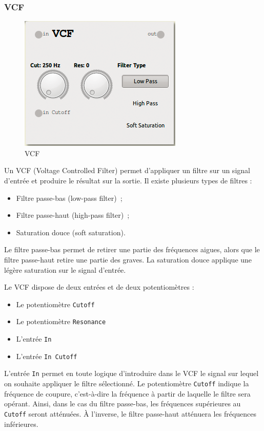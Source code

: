 \documentclass[a4paper,oneside,frenchb,12pt]{article}
\begin{document}
\subsubsection{VCF}

\begin{figure}[h!]
\centering
\includegraphics[scale=0.5]{../img/png/vcf.png}
\caption{VCF}
\end{figure}

Un VCF (Voltage Controlled Filter) permet d'appliquer un filtre sur un
signal d'entrée et produire le résultat sur la sortie. Il existe
plusieurs types de filtres :

\begin{itemize}
\item
  Filtre passe-bas (low-pass filter)~;
\item
  Filtre passe-haut (high-pass filter)~;
\item
  Saturation douce (soft saturation).
\end{itemize}
Le filtre passe-bas permet de retirer une partie des fréquences aigues,
alors que le filtre passe-haut retire une partie des graves. La
saturation douce applique une légère saturation sur le signal d'entrée.

Le VCF dispose de deux entrées et de deux potentiomètres :

\begin{itemize}
\item
  Le potentiomètre \verb!Cutoff!
\item
  Le potentiomètre \verb!Resonance!
\item
  L'entrée \verb!In!
\item
  L'entrée \verb!In Cutoff!
\end{itemize}
L'entrée \verb!In! permet en toute logique d'introduire dans le VCF le
signal sur lequel on souhaite appliquer le filtre sélectionné. Le
potentiomètre \verb!Cutoff! indique la fréquence de coupure,
c'est-à-dire la fréquence à partir de laquelle le filtre sera opérant.
Ainsi, dans le cas du filtre passe-bas, les fréquences supérieures au
\verb!Cutoff! seront atténuées. À l'inverse, le filtre passe-haut
atténuera les fréquences inférieures.
\end{document}
